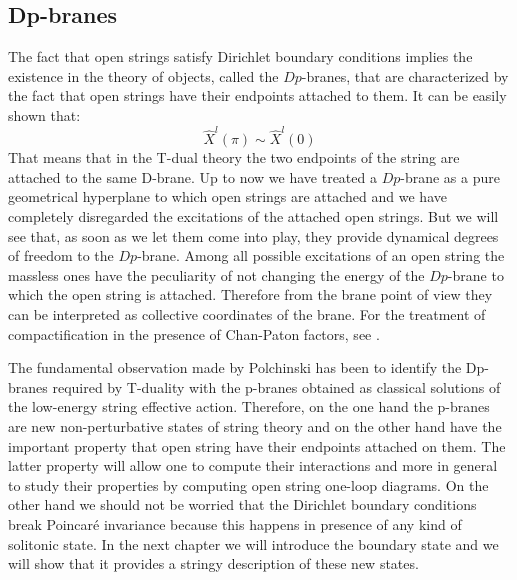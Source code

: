 \subsection{Dp-branes}
The fact that open strings satisfy Dirichlet boundary conditions implies
the existence in the theory of objects, called the $Dp$-branes, that are characterized
by the fact that open strings have their endpoints attached to
them. It can be easily shown that:
\begin{equation}
	\hat{X}^l\left(\pi\right)\sim \hat{X}^l\left(0\right)
\end{equation}
That means that in the T-dual theory the two endpoints of the string are attached to the same D-brane. Up to now we have treated a $Dp$-brane as a pure geometrical hyperplane
to which open strings are attached and we have completely disregarded the
excitations of the attached open strings. But we will see that, as soon as
we let them come into play, they provide dynamical degrees of freedom to
the $Dp$-brane.
Among all possible excitations of an open string the massless ones have
the peculiarity of not changing the energy of the $Dp$-brane to which the
open string is attached. Therefore from the brane point of view they can
be interpreted as collective coordinates of the brane. For the treatment of compactification in the presence of Chan-Paton factors, see \cite{DBRANES1}.
\par The fundamental observation made by Polchinski has been to identify
the Dp-branes required by T-duality with the p-branes obtained as classical
solutions of the low-energy string effective action. Therefore, on the one
hand the p-branes are new non-perturbative states of string theory and on
the other hand have the important property that open string have their
endpoints attached on them. The latter property will allow one to compute
their interactions and more in general to study their properties by computing
open string one-loop diagrams. On the other hand we should not
be worried that the Dirichlet boundary conditions break Poincaré invariance
because this happens in presence of any kind of solitonic state. In the
next chapter we will introduce the boundary state and we will show that
it provides a stringy description of these new states.

